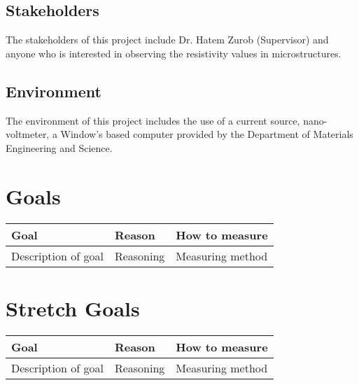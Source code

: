 \documentclass{article}
\begin{document}
\subsection{Stakeholders}
The stakeholders of this project include Dr. Hatem Zurob (Supervisor) and 
anyone who is interested in observing the resistivity values in microstructures.

\subsection{Environment}
The environment of this project includes the use of a current source, nano-voltmeter,
a Window's based computer provided by the Department of Materials Engineering and Science.

\section{Goals}



\begin{tabular}{ |p{3cm}||p{3cm}|p{4cm}|}
    \hline
    Goal& Reason & How to measure\\
    \hline
   Description of goal & Reasoning & Measuring method \\
    \hline
   \end{tabular}

\section{Stretch Goals}

\begin{tabular}{ |p{3cm}||p{3cm}|p{4cm}|}
    \hline
    Goal& Reason & How to measure\\
    \hline
   Description of goal & Reasoning & Measuring method \\
    \hline
   \end{tabular}
\end{document}
